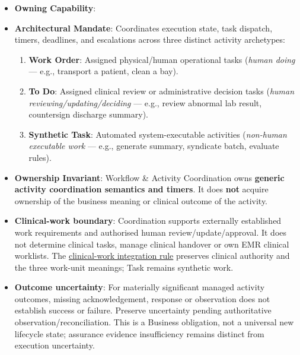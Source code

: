 \begin{itemize}

\item 
\textbf{Owning Capability}: \texttt{}



\item 
\textbf{Architectural Mandate}: Coordinates execution state, task dispatch, timers, deadlines, and escalations across three distinct activity archetypes:


\begin{enumerate}

\item 
\textbf{Work Order}: Assigned physical/\allowbreak{}human operational tasks (\emph{human doing} — e.g., transport a patient, clean a bay).



\item 
\textbf{To Do}: Assigned clinical review or administrative decision tasks (\emph{human reviewing/\allowbreak{}updating/\allowbreak{}deciding} — e.g., review abnormal lab result, countersign discharge summary).



\item 
\textbf{Synthetic Task}: Automated system-executable activities (\emph{non-human executable work} — e.g., generate summary, syndicate batch, evaluate rules).



\end{enumerate}


\item 
\textbf{Ownership Invariant}: Workflow \& Activity Coordination owns \textbf{generic activity coordination semantics and timers}. It does \textbf{not} acquire ownership of the business meaning or clinical outcome of the activity.



\item 
\textbf{Clinical-work boundary}: Coordination supports externally established work requirements and authorised human review/\allowbreak{}update/\allowbreak{}approval. It does not determine clinical tasks, manage clinical handover or own EMR clinical worklists. The \hyperref[rad:metamodel:173]{clinical-work integration rule} preserves clinical authority and the three work-unit meanings; Task remains synthetic work.



\item 
\textbf{Outcome uncertainty}: For materially significant managed activity outcomes, missing acknowledgement, response or observation does not establish success or failure. Preserve uncertainty pending authoritative observation/\allowbreak{}reconciliation. This is a Business obligation, not a universal new lifecycle state; assurance evidence insufficiency remains distinct from execution uncertainty.




\end{itemize}
